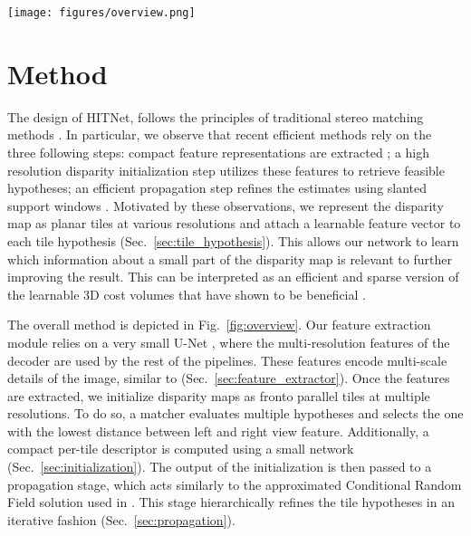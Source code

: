 \documentclass[final]{cvpr}
\newcommand{\Section}[1]{Sec.~\ref{sec:#1}}
\newcommand{\algoname}{HITNet}
\newcommand{\CIRCLE}[1]{\raisebox{.5pt}{\footnotesize \textcircled{\raisebox{-.6pt}{#1}}}}
\begin{document}
\begin{figure*}[t]
    \centering
    \texttt{[image: figures/overview.png]}
    \caption{Overview of the proposed framework. (Top) A U-Net is used to extract features at multiple scales from left and right images. The initialization step is run on each scale of the extracted features. This step operates on \textit{tiles} of  feature regions and evaluates multiple disparity hypotheses. The disparity with the minimum cost is selected. (Bottom) The output of the initialization is then used at propagation stage to refine the predicted disparity hypotheses using slanted support windows.
   }
    \label{fig:overview}
    \vspace{-10pt}
\end{figure*}

 \section{Method}
The design of \algoname, follows the principles of traditional stereo matching methods \cite{scharstein2002taxonomy}. In particular, we observe that recent efficient methods rely on the three following steps: \CIRCLE{1} compact feature representations are extracted \cite{fanello17_hashmatch,fanello2017ultrastereo}; \CIRCLE{2} a high resolution disparity initialization step utilizes these features to retrieve feasible hypotheses; \CIRCLE{3} an efficient propagation step refines the estimates using slanted support windows \cite{sos}. 
Motivated by these observations, we represent the disparity map as planar tiles at various resolutions and attach a learnable feature vector to each tile hypothesis (\Section{tile_hypothesis}). {This allows our network to learn which information about a small part of the disparity map is relevant to further improving the result.} This can be interpreted as an efficient and sparse version of the learnable 3D cost volumes that have shown to be beneficial \cite{kendall2017end}. 

The overall method is depicted in Fig.~\ref{fig:overview}. Our feature extraction module relies on a very small U-Net \cite{ronneberger2015u}, where the multi-resolution features of the decoder are used by the rest of the pipelines. These features encode multi-scale details of the image, similar to \cite{chang2018pyramid} (\Section{feature_extractor}).
Once the features are extracted, we initialize disparity maps as fronto parallel tiles at multiple resolutions. To do so, a matcher evaluates multiple hypotheses and selects the one with the lowest  distance between left and right view feature. Additionally, a compact per-tile descriptor is computed using a small network (\Section{initialization}).
The output of the initialization is then passed to a propagation stage, which acts similarly to the approximated Conditional Random Field solution used in \cite{fanello17_hashmatch,sos}. This stage {hierarchically} refines the tile hypotheses in an iterative fashion (\Section{propagation}).
\end{document}
